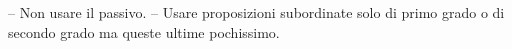 -- Non usare il passivo.
-- Usare proposizioni subordinate solo di primo grado o di secondo grado ma queste ultime pochissimo.
